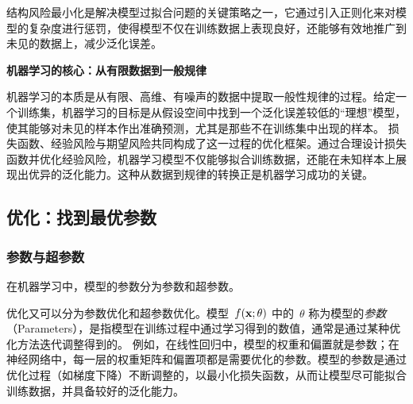 结构风险最小化是解决模型过拟合问题的关键策略之一，它通过引入正则化来对模型的复杂度进行惩罚，使得模型不仅在训练数据上表现良好，还能够有效地推广到未见的数据上，减少泛化误差。



{\bf 机器学习的核心：从有限数据到一般规律}

机器学习的本质是从有限、高维、有噪声的数据中提取一般性规律的过程。给定一个训练集，机器学习的目标是从假设空间中找到一个泛化误差较低的“理想”模型，使其能够对未见的样本作出准确预测，尤其是那些不在训练集中出现的样本。
损失函数、经验风险与期望风险共同构成了这一过程的优化框架。通过合理设计损失函数并优化经验风险，机器学习模型不仅能够拟合训练数据，还能在未知样本上展现出优异的泛化能力。这种从数据到规律的转换正是机器学习成功的关键。

\subsection{优化：找到最优参数}

\subsubsection{参数与超参数}

在机器学习中，模型的参数分为参数和超参数。

优化又可以分为参数优化和超参数优化。模型~$f ({\bf x}; \theta)$ 中的~$\theta$ 称为模型的{\em 参数}（Parameters），是指模型在训练过程中通过学习得到的数值，通常是通过某种优化方法迭代调整得到的。
例如，在线性回归中，模型的权重和偏置就是参数；在神经网络中，每一层的权重矩阵和偏置项都是需要优化的参数。模型的参数是通过优化过程（如梯度下降）不断调整的，以最小化损失函数，从而让模型尽可能拟合训练数据，并具备较好的泛化能力。

